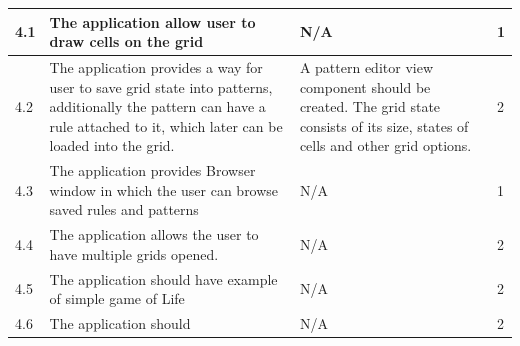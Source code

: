 \documentclass{article}
\begin{document}
\begin{center}
\begin{tabular}{| l | p{7cm} | p{5cm} | l |}
		4.1 & 
		The application allow user to draw cells on the grid & 
		N/A &
		1
		\\ \hline		

		4.2 & 
		The application provides a way for user to save grid state into patterns, additionally
		the pattern can have a rule attached to it, which later can be loaded into the grid.  & 
		A pattern editor view component should be created.
		The grid state consists of its size, states of cells and other grid options.&
		2
		\\ \hline				

		4.3 & 
		The application provides Browser window in which the 
		user can browse saved rules and patterns & 
		N/A &
		1 
		\\ \hline
	
		4.4 & 
		The application allows the user to have multiple grids opened. &
		N/A &
		2 
		\\ \hline
		4.5 & 
		The application should have example of simple game of Life &
		N/A &
		2 
		
		\\ \hline
		4.6 & 
		The application should &
		N/A &
		2 
		\\ \hline
	
	\end{tabular}

\end{center}

\newpage
\end{document}
